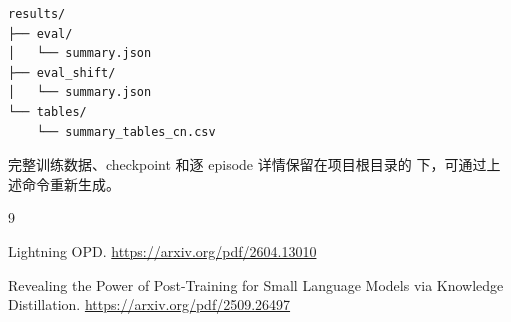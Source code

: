 \documentclass[11pt]{ctexart}
\begin{document}
\begin{lstlisting}
results/
├── eval/
│   └── summary.json
├── eval_shift/
│   └── summary.json
└── tables/
    └── summary_tables_cn.csv
\end{lstlisting}

完整训练数据、checkpoint 和逐 episode 详情保留在项目根目录的  下，可通过上述命令重新生成。

\begin{thebibliography}{9}

Lightning OPD.
\newblock \url{https://arxiv.org/pdf/2604.13010}

Revealing the Power of Post-Training for Small Language Models via Knowledge Distillation.
\newblock \url{https://arxiv.org/pdf/2509.26497}

\end{thebibliography}
\end{document}
